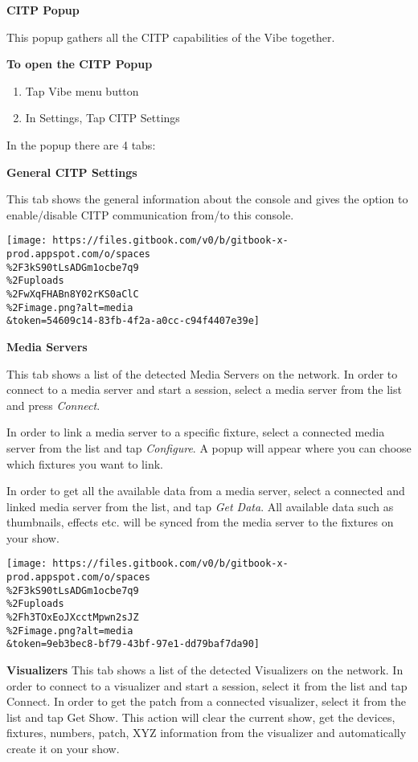 \documentclass[
]{article}
\begin{document}
\textbf{CITP Popup}

This popup gathers all the CITP capabilities of the Vibe together.

\textbf{To open the CITP Popup}

\begin{enumerate}
\def\labelenumi{\arabic{enumi}.}
\item
  Tap Vibe menu button
\item
  In Settings, Tap CITP Settings
\end{enumerate}

In the popup there are 4 tabs:

\textbf{General CITP Settings}

This tab shows the general information about the console and gives the option to enable/disable CITP communication from/to this console.

\texttt{[image: https://files.gitbook.com/v0/b/gitbook-x-prod.appspot.com/o/spaces\\\%2F3kS90tLsADGm1ocbe7q9\\\%2Fuploads\\\%2FwXqFHABn8Y02rKS0aClC\\\%2Fimage.png?alt=media\\\&token=54609c14-83fb-4f2a-a0cc-c94f4407e39e]}

\textbf{Media Servers}

This tab shows a list of the detected Media Servers on the network. In order to connect to a media server and start a session, select a media server from the list and press \emph{Connect}.

In order to link a media server to a specific fixture, select a connected media server from the list and tap \emph{Configure}. A popup will appear where you can choose which fixtures you want to link.

In order to get all the available data from a media server, select a connected and linked media server from the list, and tap \emph{Get Data}. All available data such as thumbnails, effects etc. will be synced from the media server to the fixtures on your show.

\texttt{[image: https://files.gitbook.com/v0/b/gitbook-x-prod.appspot.com/o/spaces\\\%2F3kS90tLsADGm1ocbe7q9\\\%2Fuploads\\\%2Fh3TOxEoJXcctMpwn2sJZ\\\%2Fimage.png?alt=media\\\&token=9eb3bec8-bf79-43bf-97e1-dd79baf7da90]}

\textbf{Visualizers}
This tab shows a list of the detected Visualizers on the network. In order to connect to a visualizer and start a session, select it from the list and tap Connect. In order to get the patch from a connected visualizer, select it from the list and tap Get Show. This action will clear the current show, get the devices, fixtures, numbers, patch, XYZ information from the visualizer and automatically create it on your show.
\end{document}
